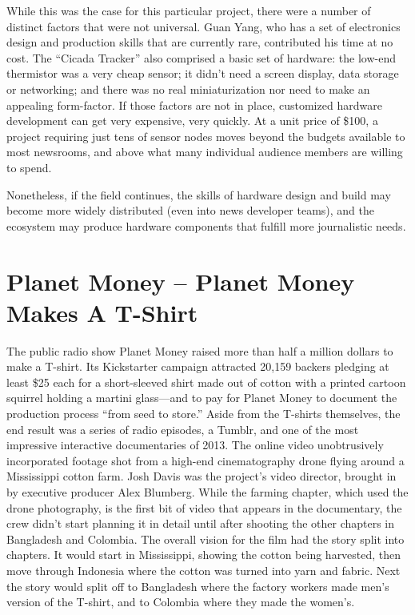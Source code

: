 \begin{itemize}
While this was the case for this particular project, there were a number
of distinct factors that were not universal. Guan Yang, who has a
set of electronics design and production skills that are currently rare,
contributed his time at no cost. The ``Cicada Tracker'' also comprised
a basic set of hardware: the low-end thermistor was a very cheap
sensor; it didn't need a screen display, data storage or networking;
and there was no real miniaturization nor need to make an appealing
form-factor. If those factors are not in place, customized hardware
development can get very expensive, very quickly. At a unit price of
\$100, a project requiring just tens of sensor nodes moves beyond the
budgets available to most newsrooms, and above what many individual
audience members are willing to spend. 

Nonetheless, if the
field continues, the skills of hardware design and build may become
more widely distributed (even into news developer teams), and the
ecosystem may produce hardware components that fulfill more
journalistic needs.
\end{itemize}

\chapter{Planet Money – Planet Money Makes A T-Shirt}
The public radio show Planet Money raised more than half a million dollars
to make a T-shirt. Its Kickstarter campaign attracted 20,159 backers
pledging at least \$25 each for a short-sleeved shirt made out of cotton with
a printed cartoon squirrel holding a martini glass—and to pay for Planet
Money to document the production process ``from seed to store.''
Aside from the T-shirts themselves, the end result was a series of radio
episodes, a Tumblr, and one of the most impressive interactive documentaries
of 2013. The online video unobtrusively incorporated footage shot
from a high-end cinematography drone flying around a Mississippi cotton
farm. Josh Davis was the project's video director, brought in by executive
producer Alex Blumberg.
While the farming chapter, which used the drone photography, is the first
bit of video that appears in the documentary, the crew didn't start planning
it in detail until after shooting the other chapters in Bangladesh and Colombia.
The overall vision for the film had the story split into chapters. It would
start in Mississippi, showing the cotton being harvested, then move through
Indonesia where the cotton was turned into yarn and fabric. Next the story
would split off to Bangladesh where the factory workers made men's version
of the T-shirt, and to Colombia where they made the women's.

